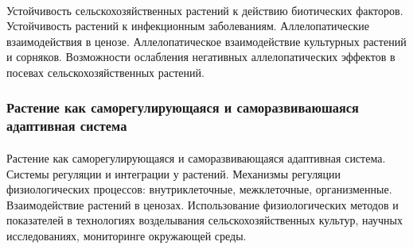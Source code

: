 \paragraph*{}Устойчивость сельскохозяйственных растений к действию биотических факторов. Устойчивость растений к инфекционным заболеваниям. Аллелопатические взаимодействия в ценозе. Аллелопатическое взаимодействие культурных растений и сорняков. Возможности ослабления негативных аллелопатических эффектов в посевах сельскохозяйственных растений.

\subsubsection{Растение как саморегулирующаяся и саморазвиваюшаяся адаптивная система}

\paragraph*{}Растение как саморегулирующаяся и саморазвивающаяся адаптивная система. Системы регуляции и интеграции у растений. Механизмы регуляции физиологических процессов: внутриклеточные, межклеточные, организменные. Взаимодействие растений в ценозах. Использование физиологических методов и показателей в технологиях возделывания сельскохозяйственных культур, научных исследованиях, мониторинге окружающей среды.